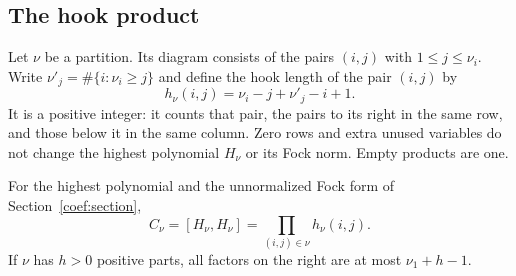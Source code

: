 \subsection{The hook product}

Let $\nu$ be a partition. Its diagram consists of the pairs
$(i,j)$ with $1\le j\le\nu_i$. Write
$\nu'_j=\#\{i:\nu_i\ge j\}$ and define the hook length of
the pair $(i,j)$ by
\[
                  h_\nu(i,j)=\nu_i-j+\nu'_j-i+1.
\]
It is a positive integer: it counts that pair, the pairs to its
right in the same row, and those below it in the same column.
Zero rows and extra unused variables do not change the highest
polynomial $H_\nu$ or its Fock norm. Empty products are one.

\begin{theorem}\label{fh-hook-product}
For the highest polynomial and the unnormalized Fock form of
Section~\ref{coef:section},
\begin{equation}\label{fh-hook-equality}
                   C_\nu=[H_\nu,H_\nu]
                          =\prod_{(i,j)\in\nu}h_\nu(i,j).
\end{equation}
If $\nu$ has $h>0$ positive parts, all factors on the right
are at most $\nu_1+h-1$.
\end{theorem}

